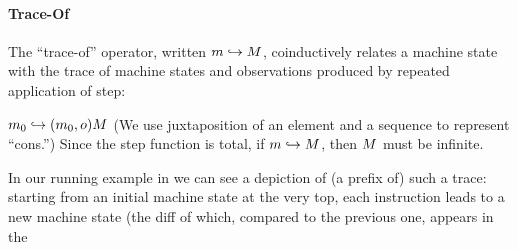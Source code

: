 \documentclass[acmsmall,review,anonymous]{acmart}\settopmatter{printfolios=true,printccs=false,printacmref=false}
\begin{document}
\paragraph*{Trace-Of}

The ``trace-of'' operator, written \(m \hookrightarrow M\),
coinductively relates a machine state with the trace of machine states
and observations produced by repeated application of step:

            {\(m_0 \hookrightarrow (m_0,o) M\)}%
%
\noindent
(We use juxtaposition of an element and a sequence to represent ``cons.'')
Since the step function is total, if \(m \hookrightarrow M\),
then \(M\) must be infinite.

In our running example in  we can
see a depiction of (a prefix of) such a trace: starting from an initial machine
state at the very top, each instruction leads to a new machine state
(the diff of which, compared to the previous one, appears in the
\end{document}
